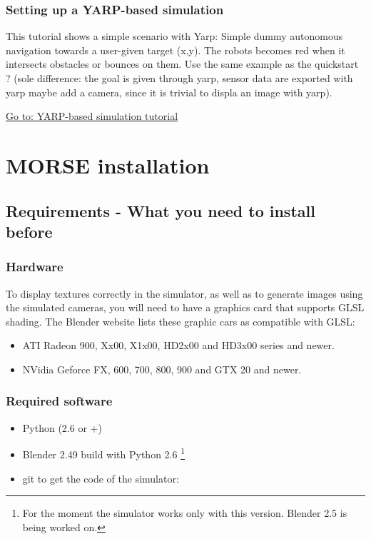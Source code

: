 \documentclass[twoside,a4paper,10pt]{report}
\newcommand{\dokutitlelevelone}[1]{\chapter{#1}}
\newcommand{\dokutitleleveltwo}[1]{\section{#1}}
\newcommand{\dokutitleleveltree}[1]{\subsection{#1}}
\newcommand{\dokufootnote}[1]{\footnote{#1}}
\newcommand{\dokuitem}{\item}
\begin{document}
\dokutitleleveltree{Setting up a YARP-based simulation}
\label{a3bba0b321b28de69351875f85d854db}%

This tutorial shows a simple scenario with Yarp: Simple dummy autonomous navigation towards a user-given target (x,y). 
The robots becomes red when it intersects obstacles or bounces on them. Use the same example as the quickstart ? 
(sole difference: the goal is given through yarp, sensor data are exported with yarp  maybe add a camera, since it is trivial to displa an image with yarp).

\hyperref[1dd029a60f7f3dd1deaf993ce4538edf]{ Go to: YARP-based simulation tutorial}

\dokutitlelevelone{MORSE installation}
\label{1d96fd68defedd8a755f2a95c80e618f}%
\label{ea09bb364ef1bffd889e76b7a59035fc}%

\dokutitleleveltwo{Requirements - What you need to install before}
\label{27060cbab4a02c4805c03a15b2aad7d7}%

\dokutitleleveltree{Hardware}
\label{3ca14c518d1bf901acc339e7c9cd6d7f}%

To display textures correctly in the simulator, as well as to generate images using the simulated cameras, you will need to have a graphics card that supports GLSL shading. The Blender website lists these graphic cars as compatible with GLSL:


\begin{itemize}
\dokuitem  ATI Radeon 9{\texttimes}00, Xx00, X1x00, HD2x00 and HD3x00 series and newer.
\dokuitem  NVidia Geforce FX, 6{\texttimes}00, 7{\texttimes}00, 8{\texttimes}00, 9{\texttimes}00 and GTX 2{\texttimes}0 and newer.
\end{itemize}

\dokutitleleveltree{Required software}
\label{accfa4c836a5caff827d9adbf6bea7dc}%

\begin{itemize}
\dokuitem  Python (2.6 or +)
\dokuitem  Blender 2.49 build with Python 2.6 \dokufootnote{For the moment the simulator works only with this version. Blender 2.5 is being worked on.}
\dokuitem  git to get the code of the simulator:
\end{itemize}

\small
{}
\normalsize
\end{document}
